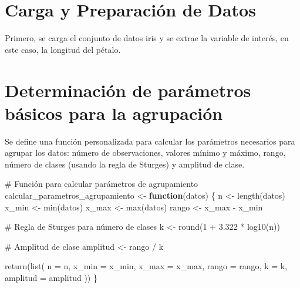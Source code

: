 \documentclass[
  spanish,
  letterpaper,
]{book}
\newenvironment{Shaded}{\begin{snugshade}}{\end{snugshade}}
\newcommand{\AttributeTok}[1]{\textcolor[rgb]{0.40,0.45,0.13}{#1}}
\newcommand{\CommentTok}[1]{\textcolor[rgb]{0.37,0.37,0.37}{#1}}
\newcommand{\ControlFlowTok}[1]{\textcolor[rgb]{0.00,0.23,0.31}{\textbf{#1}}}
\newcommand{\DecValTok}[1]{\textcolor[rgb]{0.68,0.00,0.00}{#1}}
\newcommand{\FloatTok}[1]{\textcolor[rgb]{0.68,0.00,0.00}{#1}}
\newcommand{\FunctionTok}[1]{\textcolor[rgb]{0.28,0.35,0.67}{#1}}
\newcommand{\NormalTok}[1]{\textcolor[rgb]{0.00,0.23,0.31}{#1}}
\newcommand{\OtherTok}[1]{\textcolor[rgb]{0.00,0.23,0.31}{#1}}
\newcommand{\SpecialCharTok}[1]{\textcolor[rgb]{0.37,0.37,0.37}{#1}}
\begin{document}
\section{Carga y Preparación de
Datos}\label{carga-y-preparaciuxf3n-de-datos}

Primero, se carga el conjunto de datos iris y se extrae la variable de
interés, en este caso, la longitud del pétalo.

\begin{Shaded}
\end{Shaded}

\section{Determinación de parámetros básicos para la
agrupación}\label{determinaciuxf3n-de-paruxe1metros-buxe1sicos-para-la-agrupaciuxf3n}

Se define una función personalizada para calcular los parámetros
necesarios para agrupar los datos: número de observaciones, valores
mínimo y máximo, rango, número de clases (usando la regla de Sturges) y
amplitud de clase.

\begin{Shaded}
\begin{Highlighting}[]
\CommentTok{\# Función para calcular parámetros de agrupamiento}
\NormalTok{calcular\_parametros\_agrupamiento }\OtherTok{\textless{}{-}} \ControlFlowTok{function}\NormalTok{(datos) \{}
\NormalTok{  n }\OtherTok{\textless{}{-}} \FunctionTok{length}\NormalTok{(datos)}
\NormalTok{  x\_min }\OtherTok{\textless{}{-}} \FunctionTok{min}\NormalTok{(datos)}
\NormalTok{  x\_max }\OtherTok{\textless{}{-}} \FunctionTok{max}\NormalTok{(datos)}
\NormalTok{  rango }\OtherTok{\textless{}{-}}\NormalTok{ x\_max }\SpecialCharTok{{-}}\NormalTok{ x\_min}
  
  \CommentTok{\# Regla de Sturges para número de clases}
\NormalTok{  k }\OtherTok{\textless{}{-}} \FunctionTok{round}\NormalTok{(}\DecValTok{1} \SpecialCharTok{+} \FloatTok{3.322} \SpecialCharTok{*} \FunctionTok{log10}\NormalTok{(n))}
  
  \CommentTok{\# Amplitud de clase}
\NormalTok{  amplitud }\OtherTok{\textless{}{-}}\NormalTok{ rango }\SpecialCharTok{/}\NormalTok{ k}
  
  \FunctionTok{return}\NormalTok{(}\FunctionTok{list}\NormalTok{(}
    \AttributeTok{n =}\NormalTok{ n,}
    \AttributeTok{x\_min =}\NormalTok{ x\_min,}
    \AttributeTok{x\_max =}\NormalTok{ x\_max,}
    \AttributeTok{rango =}\NormalTok{ rango,}
    \AttributeTok{k =}\NormalTok{ k,}
    \AttributeTok{amplitud =}\NormalTok{ amplitud}
\NormalTok{  ))}
\NormalTok{\}}
\end{Highlighting}
\end{Shaded}
\end{document}
